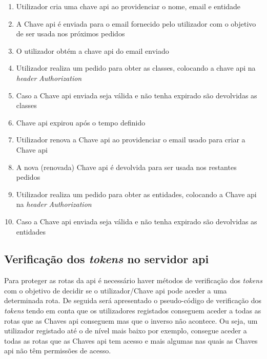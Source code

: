 \begin{enumerate}
    \item Utilizador cria uma chave \acrshort{api} ao providenciar o nome, email e entidade
    \item A Chave \acrshort{api} é enviada para o email fornecido pelo utilizador com o objetivo de ser usada nos próximos pedidos
    \item O utilizador obtém a chave \acrshort{api} do email enviado
    \item Utilizador realiza um pedido para obter as classes, colocando a chave \acrshort{api} na \textit{header} \textit{Authorization}
    \item Caso a Chave \acrshort{api} enviada seja válida e não tenha expirado são devolvidas as classes
    \item Chave \acrshort{api} expirou após o tempo definido
    \item Utilizador renova a Chave \acrshort{api} ao providenciar o email usado para criar a Chave \acrshort{api}
    \item A nova (renovada) Chave \acrshort{api} é devolvida para ser usada nos restantes pedidos
    \item Utilizador realiza um pedido para obter as entidades, colocando a Chave \acrshort{api} na \textit{header} \textit{Authorization}
    \item Caso a Chave \acrshort{api} enviada seja válida e não tenha expirado são devolvidas as entidades
\end{enumerate}

\subsection{Verificação dos \textit{tokens} no servidor \acrshort{api}}

Para proteger as rotas da \acrshort{api} é necessário haver métodos de verificação dos \textit{tokens} com o objetivo de decidir se o utilizador/Chave \acrshort{api} pode aceder a uma determinada rota. De seguida será apresentado o pseudo-código de verificação dos \textit{tokens} tendo em conta que os utilizadores registados conseguem aceder a todas as rotas que as Chaves \acrshort{api} conseguem mas que o inverso não acontece. Ou seja, um utilizador registado até o de nível mais baixo por exemplo, consegue aceder a todas as rotas que as Chaves \acrshort{api} tem acesso e mais algumas nas quais as Chaves \acrshort{api} não têm permissões de acesso.

